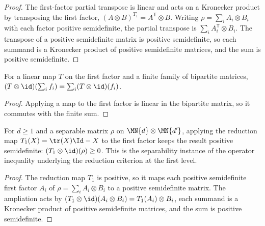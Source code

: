 \begin{proof}
    \leanok
    The first-factor partial transpose is linear and acts on a Kronecker product by
    transposing the first factor, $(A\otimes B)^{T_1}=A^{\mathsf T}\otimes B$.
    Writing $\rho=\sum_i A_i\otimes B_i$ with each factor positive semidefinite, the
    partial transpose is $\sum_i A_i^{\mathsf T}\otimes B_i$. The transpose of a
    positive semidefinite matrix is positive semidefinite, so each summand is a
    Kronecker product of positive semidefinite matrices, and the sum is positive
    semidefinite.
\end{proof}

\begin{theorem}
    \label{thm:tensor_map_id_sum}
    \leanok
    For a linear map $T$ on the first factor and a finite family of bipartite
    matrices,
    $(T\otimes\id)(\sum_i f_i)=\sum_i (T\otimes\id)(f_i)$.
\end{theorem}

\begin{proof}
    \leanok
    Applying a map to the first factor is linear in the bipartite matrix, so it
    commutes with the finite sum.
\end{proof}

\begin{theorem}
    \label{thm:is_separable_reduction_one}
    \leanok
    For $d\ge 1$ and a separable matrix $\rho$ on $\MN{d}\otimes\MN{d'}$, applying
    the reduction map $T_1(X)=\tr(X)\Id-X$ to the first factor keeps the result
    positive semidefinite: $(T_1\otimes\id)(\rho)\ge 0$.
    This is the separability instance of the operator inequality underlying the
    reduction criterion at the first level.
\end{theorem}

\begin{proof}
    \leanok
    The reduction map $T_1$ is positive, so it maps each positive semidefinite first
    factor $A_i$ of $\rho=\sum_i A_i\otimes B_i$ to a positive semidefinite matrix.
    The ampliation acts by $(T_1\otimes\id)(A_i\otimes B_i)=T_1(A_i)\otimes B_i$, each
    summand is a Kronecker product of positive semidefinite matrices, and the sum is
    positive semidefinite.
\end{proof}
